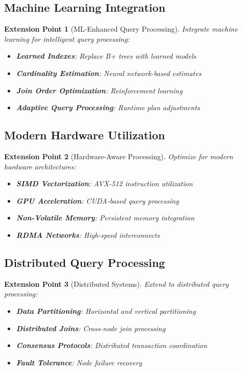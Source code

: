 \documentclass[12pt,a4paper]{article}
\newtheorem{extension}{Extension Point}[section]
\begin{document}
\subsection{Machine Learning Integration}

\begin{extension}[ML-Enhanced Query Processing]
Integrate machine learning for intelligent query processing:

\begin{itemize}
    \item \textbf{Learned Indexes}: Replace B+ trees with learned models
    \item \textbf{Cardinality Estimation}: Neural network-based estimates
    \item \textbf{Join Order Optimization}: Reinforcement learning
    \item \textbf{Adaptive Query Processing}: Runtime plan adjustments
\end{itemize}
\end{extension}

\subsection{Modern Hardware Utilization}

\begin{extension}[Hardware-Aware Processing]
Optimize for modern hardware architectures:

\begin{itemize}
    \item \textbf{SIMD Vectorization}: AVX-512 instruction utilization
    \item \textbf{GPU Acceleration}: CUDA-based query processing
    \item \textbf{Non-Volatile Memory}: Persistent memory integration
    \item \textbf{RDMA Networks}: High-speed interconnects
\end{itemize}
\end{extension}

\subsection{Distributed Query Processing}

\begin{extension}[Distributed Systems]
Extend to distributed query processing:

\begin{itemize}
    \item \textbf{Data Partitioning}: Horizontal and vertical partitioning
    \item \textbf{Distributed Joins}: Cross-node join processing
    \item \textbf{Consensus Protocols}: Distributed transaction coordination
    \item \textbf{Fault Tolerance}: Node failure recovery
\end{itemize}
\end{extension}
\end{document}
